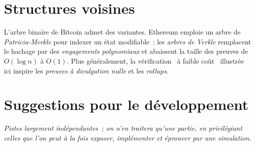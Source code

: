 \documentclass[11pt,a4paper]{article}
\theoremstyle{definition}\newtheorem{definition}{Définition}
\theoremstyle{plain}\newtheorem{theoreme}{Théorème}\newtheorem{proposition}{Proposition}
\theoremstyle{remark}\newtheorem{remarque}{Remarque}
\begin{document}
\section{Structures voisines}

L'arbre binaire de Bitcoin admet des variantes. Ethereum emploie un arbre de \emph{Patricia-Merkle}
pour indexer un état modifiable~; les \emph{arbres de Verkle} remplacent le hachage par des
\emph{engagements polynomiaux} et abaissent la taille des preuves de $O(\log n)$ à $O(1)$. Plus
généralement, la vérification \guillemotleft~à faible coût~\guillemotright{} illustrée ici inspire
les \emph{preuves à divulgation nulle} et les \emph{rollups}.

\section*{Suggestions pour le développement}

\emph{Pistes largement indépendantes~; on n'en traitera qu'une partie, en privilégiant celles que
l'on peut à la fois exposer, implémenter et éprouver par une simulation.}
\end{document}
